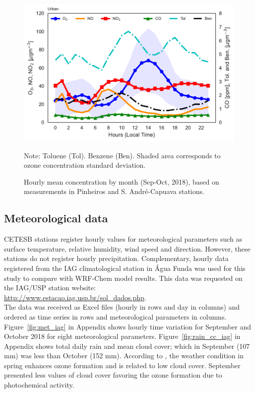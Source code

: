 	\begin{figure}[hbt]
		\begin{center}
			\includegraphics{fig/byhour_all_polls.pdf}
		\end{center}
  		\caption{Hourly mean concentration by month (Sep-Oct, 2018), based on measurements in Pinheiros and S. André-Capuava stations.\\}
  		{\scriptsize Note: Toluene (Tol). Benzene (Ben). Shaded area corresponds to ozone concentration standard deviation.}
  		\label{fig:hc_all_hour}
	\end{figure}

  
  \subsection{Meteorological data}
  CETESB stations register hourly values for meteorological parameters such as surface temperature, relative humidity, wind speed and direction.
  However, these stations do not register hourly precipitation.
  Complementary, hourly data registered from the IAG climatological station in Água Funda was used for this study to compare with WRF-Chem model results.
  This data was requested on the IAG/USP station website: \\ \url{http://www.estacao.iag.usp.br/sol_dados.php}.\\
  The data was received as Excel files (hourly in rows and day in columns) and ordered as time series in rows and meteorological parameters in columns.
  Figure~\ref{fig:met_iag} in Appendix shows hourly time variation for September and October 2018 for eight meteorological parameters.
  Figure~\ref{fig:rain_cc_iag} in Appendix shows total daily rain and mean cloud cover; which in September (107 mm) was less than October (152 mm).
  According to \citet{Carvalho2015}, the weather condition in spring enhances ozone formation and is related to low cloud cover.
  September presented less values of cloud cover favoring the ozone formation due to photochemical activity.
  
